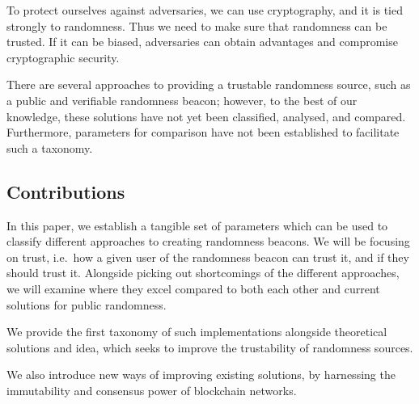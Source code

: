 
To protect ourselves against adversaries, we can use cryptography, and it is tied strongly to randomness. Thus we need to make sure that randomness can be trusted. If it can be biased, adversaries can obtain advantages and compromise cryptographic security.

There are several approaches to providing a trustable randomness source, such as a public and verifiable randomness beacon; however, to the best of our knowledge, these solutions have not yet been classified, analysed, and compared.
Furthermore, parameters for comparison have not been established to facilitate such a taxonomy.

\subsection*{Contributions}\label{subsec:contributions}
In this paper, we establish a tangible set of parameters which can be used to classify different approaches to creating randomness beacons. We will be focusing on trust, i.e.\ how a given user of the randomness beacon can trust it, and if they should trust it.
Alongside picking out shortcomings of the different approaches, we will examine where they excel compared to both each other and current solutions for public randomness.

We provide the first taxonomy of such implementations alongside theoretical solutions and idea, which seeks to improve the trustability of randomness sources.

We also introduce new ways of improving existing solutions, by harnessing the immutability and consensus power of blockchain networks.



